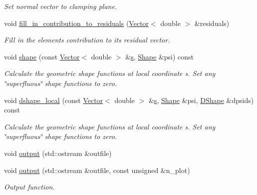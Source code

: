 \begin{DoxyCompactItemize}
\begin{DoxyCompactList}\small\item\em Set normal vector to clamping plane. \end{DoxyCompactList}\item 
void \hyperlink{classoomph_1_1ClampedHermiteShellBoundaryConditionElement_ab50bd8d39186b633c398c508f9caf7fb}{fill\+\_\+in\+\_\+contribution\+\_\+to\+\_\+residuals} (\hyperlink{classoomph_1_1Vector}{Vector}$<$ double $>$ \&residuals)
\begin{DoxyCompactList}\small\item\em Fill in the element\textquotesingle{}s contribution to its residual vector. \end{DoxyCompactList}\item 
void \hyperlink{classoomph_1_1ClampedHermiteShellBoundaryConditionElement_ae9a3033b7bcba34dafcb7154be331b7f}{shape} (const \hyperlink{classoomph_1_1Vector}{Vector}$<$ double $>$ \&\hyperlink{cfortran_8h_ab7123126e4885ef647dd9c6e3807a21c}{s}, \hyperlink{classoomph_1_1Shape}{Shape} \&psi) const
\begin{DoxyCompactList}\small\item\em Calculate the geometric shape functions at local coordinate s. Set any \char`\"{}superfluous\char`\"{} shape functions to zero. \end{DoxyCompactList}\item 
void \hyperlink{classoomph_1_1ClampedHermiteShellBoundaryConditionElement_aa7324ef347e70cfa0828fa7c82074398}{dshape\+\_\+local} (const \hyperlink{classoomph_1_1Vector}{Vector}$<$ double $>$ \&\hyperlink{cfortran_8h_ab7123126e4885ef647dd9c6e3807a21c}{s}, \hyperlink{classoomph_1_1Shape}{Shape} \&psi, \hyperlink{classoomph_1_1DShape}{D\+Shape} \&dpsids) const
\begin{DoxyCompactList}\small\item\em Calculate the geometric shape functions at local coordinate s. Set any \char`\"{}superfluous\char`\"{} shape functions to zero. \end{DoxyCompactList}\item 
void \hyperlink{classoomph_1_1ClampedHermiteShellBoundaryConditionElement_a1595e604991ff18f4d907da5a8fdf40b}{output} (std\+::ostream \&outfile)
\item 
void \hyperlink{classoomph_1_1ClampedHermiteShellBoundaryConditionElement_a099a046661da996bac32617c0479b220}{output} (std\+::ostream \&outfile, const unsigned \&n\+\_\+plot)
\begin{DoxyCompactList}\small\item\em Output function. \end{DoxyCompactList}\item 

\end{DoxyCompactItemize}
